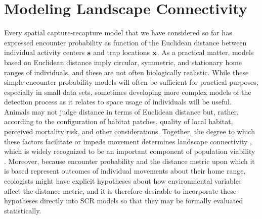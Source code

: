 \chapter{
Modeling Landscape Connectivity
}
\label{chapt.ecoldist}


\vspace{.3in}


Every spatial capture-recapture model that we have considered so far
has expressed encounter probability as function of the Euclidean
distance between individual activity centers ${\bf s}$ and trap
locations ${\bf x}$.  As a practical matter, models based on Euclidean
distance imply circular, symmetric, and stationary home ranges of
individuals, and these are not often biologically realistic.  While
these simple encounter probability models will often be sufficient for
practical purposes, especially in small data sets, sometimes
developing more complex models of the detection process as it relates
to space usage of individuals will be useful.  Animals may not judge
distance in terms of Euclidean distance but, rather, according to
the configuration of habitat patches, quality of local habitat, %
perceived mortality
risk, and other considerations. %
Together, the degree to which these factors facilitate or impede
movement determines landscape connectivity
\citep{tischendorf_fahrig:2000}, which is widely recognized to be an
important component of population viability
\citep{with_crist:1995,compton_etal:2007}.
Moreover, because encounter probability and the distance metric upon which it is
based represent outcomes of individual movements about their home
range, ecologists might have explicit hypotheses about how
environmental variables affect the distance metric, and it is
therefore desirable to incorporate these hypotheses directly into SCR
models so that they may be formally evaluated statistically.

